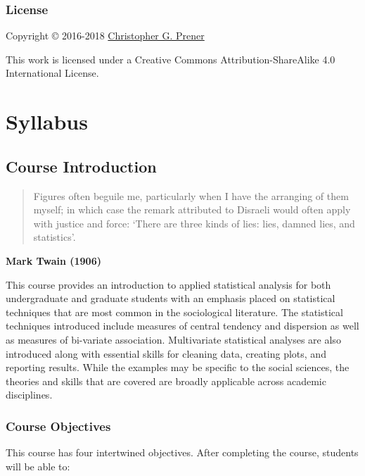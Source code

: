 \documentclass[]{book}
\theoremstyle{definition}
\theoremstyle{definition}
\theoremstyle{definition}
\theoremstyle{remark}
\begin{document}
\section*{License}\label{license}

Copyright © 2016-2018 \href{https://chris-prener.github.io}{Christopher
G. Prener}

This work is licensed under a Creative Commons Attribution-ShareAlike
4.0 International License.

\part{Syllabus}\label{part-syllabus}

\chapter{Course Introduction}\label{course-introduction}

\begin{quote}
Figures often beguile me, particularly when I have the arranging of them
myself; in which case the remark attributed to Disraeli would often
apply with justice and force: `There are three kinds of lies: lies,
damned lies, and statistics'.
\end{quote}

\textbf{Mark Twain (1906)}

This course provides an introduction to applied statistical analysis for
both undergraduate and graduate students with an emphasis placed on
statistical techniques that are most common in the sociological
literature. The statistical techniques introduced include measures of
central tendency and dispersion as well as measures of bi-variate
association. Multivariate statistical analyses are also introduced along
with essential skills for cleaning data, creating plots, and reporting
results. While the examples may be specific to the social sciences, the
theories and skills that are covered are broadly applicable across
academic disciplines.

\section{Course Objectives}\label{course-objectives}

This course has four intertwined objectives. After completing the
course, students will be able to:
\end{document}
